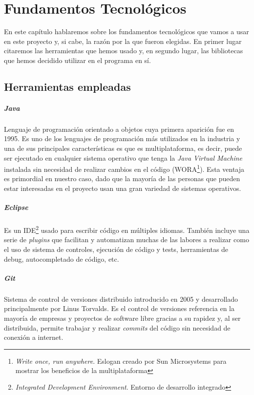 \chapter{Fundamentos Tecnológicos}

En este capítulo hablaremos sobre los fundamentos tecnológicos que vamos a usar en este proyecto y, si cabe, la razón por la que fueron elegidas. En primer lugar citaremos las herramientas que hemos usado y, en segundo lugar, las bibliotecas que hemos decidido utilizar en el programa en sí.

\section{Herramientas empleadas}

\paragraph{Java} Lenguaje de programación orientado a objetos cuya primera aparición fue en 1995. Es uno de los lenguajes de programación más utilizados en la industria y una de sus principales características es que es multiplataforma, es decir, puede ser ejecutado en cualquier sistema operativo que tenga la \textit{Java Virtual Machine} instalada sin necesidad de realizar cambios en el código (WORA\footnote{\textit{Write once, run anywhere}. Eslogan creado por Sun Microsystems para mostrar los beneficios de la multiplataforma}). Esta ventaja es primordial en nuestro caso, dado que la mayoría de las personas que pueden estar interesadas en el proyecto usan una gran variedad de sistemas operativos.

 \paragraph{Eclipse} Es un IDE\footnote{\textit{Integrated Development Environment}. Entorno de desarrollo integrado} usado para escribir código en múltiples idiomas. También incluye una serie de \textit{plugins} que facilitan y automatizan muchas de las labores a realizar como el uso de sistema de controles, ejecución de código y tests, herramientas de debug, autocompletado de código, etc.

 \paragraph{Git} Sistema de control de versiones distribuido introducido en 2005 y desarrollado principalmente por Linus Torvalds. Es el control de versiones referencia en la mayoría de empresas y proyectos de software libre gracias a su rapidez y, al ser distribuida, permite trabajar y realizar \textit{commits} del código sin necesidad de conexión a internet.

